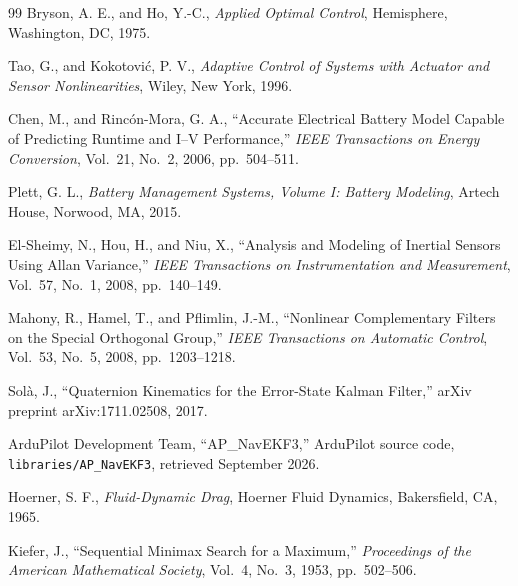 \documentclass[10pt,letterpaper]{article}
\begin{document}
\begin{thebibliography}{99}
Bryson, A. E., and Ho, Y.-C., \textit{Applied Optimal Control}, Hemisphere, Washington, DC, 1975.

Tao, G., and Kokotovi\'c, P. V., \textit{Adaptive Control of Systems with Actuator and Sensor Nonlinearities}, Wiley, New York, 1996.

Chen, M., and Rinc\'on-Mora, G. A., ``Accurate Electrical Battery Model Capable of Predicting Runtime and I--V Performance,'' \textit{IEEE Transactions on Energy Conversion}, Vol.~21, No.~2, 2006, pp.~504--511.

Plett, G. L., \textit{Battery Management Systems, Volume I: Battery Modeling}, Artech House, Norwood, MA, 2015.

El-Sheimy, N., Hou, H., and Niu, X., ``Analysis and Modeling of Inertial Sensors Using Allan Variance,'' \textit{IEEE Transactions on Instrumentation and Measurement}, Vol.~57, No.~1, 2008, pp.~140--149.

Mahony, R., Hamel, T., and Pflimlin, J.-M., ``Nonlinear Complementary Filters on the Special Orthogonal Group,'' \textit{IEEE Transactions on Automatic Control}, Vol.~53, No.~5, 2008, pp.~1203--1218.

Sol\`a, J., ``Quaternion Kinematics for the Error-State Kalman Filter,'' arXiv preprint arXiv:1711.02508, 2017.

ArduPilot Development Team, ``AP\_NavEKF3,'' ArduPilot source code, \texttt{libraries/AP\_NavEKF3}, retrieved September 2026.

Hoerner, S. F., \textit{Fluid-Dynamic Drag}, Hoerner Fluid Dynamics, Bakersfield, CA, 1965.

Kiefer, J., ``Sequential Minimax Search for a Maximum,'' \textit{Proceedings of the American Mathematical Society}, Vol.~4, No.~3, 1953, pp.~502--506.

\end{thebibliography}
\end{document}
